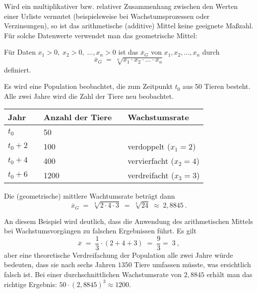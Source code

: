 \begin{MIntro}
Wird ein multiplikativer bzw. relativer Zusammenhang zwischen den Werten einer Urliste vermutet (beispielsweise bei Wachstumsprozessen oder Verzinsungen),
so ist das arithmetische (additive) Mittel keine geeignete Maßzahl. Für solche Datenwerte verwendet man das geometrische Mittel:

\begin{MInfo}
Für Daten $x_{1}>0,\;x_{2}>0,\;\ldots ,x_{n}>0$ ist das  $\overline{x}_{G}$ von $x_{1},x_{2},\ldots ,x_{n}$ durch
$$
\overline{x}_{G}\; =\; \sqrt[n]{x_{1}\cdot x_{2}\cdot \ldots \cdot x_{n}}
$$
definiert.
\end{MInfo}

\begin{MExample}
Es wird eine Population beobachtet, die zum Zeitpunkt $t_{0}$ aus 50 Tieren besteht. Alle zwei Jahre wird die Zahl der Tiere neu beobachtet.

\begin{center}
\begin{tabular}{|l|l|l|l|l|}
\hline
Jahr & & Anzahl der Tiere & & Wachstumsrate \\ \hline
$t_{0}$ & & 50 \\ \hline
$t_{0}+2$ & & 100 & & verdoppelt ($x_{1}=2$)\\ \hline
$t_{0}+4$ & & 400 & & vervierfacht ($x_{2}=4$)\\ \hline
$t_{0}+6$ & & 1200 & & verdreifacht ($x_{3}=3$)\\ \hline
\end{tabular}
\end{center}

Die (geometrische) mittlere Wachtumsrate beträgt dann
$$
\overline{x}_G\; =\; \sqrt[3]{2\cdot 4\cdot 3}\; =\; \sqrt[3]{24}\; \approx\; 2,8845\: .
$$
\end{MExample}

An diesem Beispiel wird deutlich, dass die Anwendung des arithmetischen Mittels bei Wachstumsvorgängen zu falschen Ergebnissen führt. Es gilt
$$
\overline{x}\; =\;\frac{1}{3}\cdot (2+4+3)\; =\; \frac{9}{3}=\; 3\: ,
$$
aber eine theoretische Verdreifachung der Population alle zwei Jahre würde bedeuten, dass sie nach sechs Jahren $1350$ Tiere umfassen müsste, was ersichtlich falsch ist.
Bei einer durchschnittlichen Wachstumsrate von $2,8845$ erhält man das richtige Ergebnis: $50\cdot (2,8845)^{3}\approx 1200$.


\end{MIntro}
